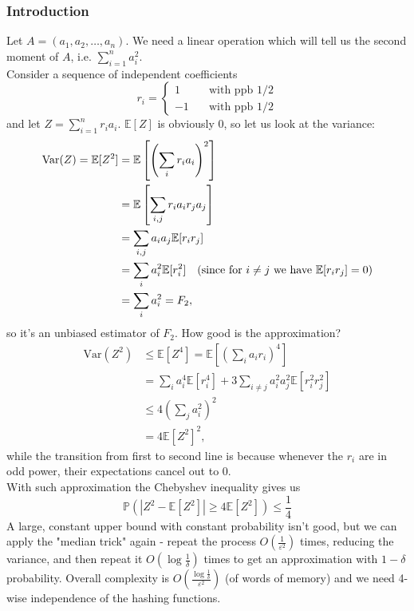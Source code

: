 \documentclass[11pt]{article}
\newcommand{\var}{\mathrm{Var}}
\begin{document}
\subsubsection{Introduction}
Let $A = (a_1, a_2, \dots, a_n)$. We need a linear operation which will tell us the second moment of $A$, i.e. $\sum_{i=1}^n a_i^2$. \\
Consider a sequence of independent coefficients $$r_i = \begin{cases}1 \quad&\textrm{with ppb }1/2\\ -1\quad&\textrm{with ppb }1/2 \end{cases}$$ 
and let $Z = \sum_{i=1}^n r_i a_i$. $\mathbb{E}[Z]$ is obviously 0, so let us look at the variance:
\begin{align*}
    \var(Z) = \mathbb{E}[Z^2] &= \mathbb{E}\left[ \left( \sum_i r_i a_i \right)^2 \right] \\
    &= \mathbb{E}\left[\sum_{i, j} r_i a_i r_j a_j \right] \\
    &= \sum_{i, j}a_i a_j \mathbb{E}[r_i r_j] \\
    &= \sum_i a_i^2 \mathbb{E}[r_i^2] \text{\quad (since for $i \neq j$ we have $\mathbb{E}[r_i r_j] = 0$)} \\
    &= \sum_i a_i^2 = F_2,
\end{align*}
so it's an unbiased estimator of $F_2$. How good is the approximation?
\begin{align*}
    \var(Z^2) &\leq \mathbb{E}[Z^4] = \mathbb{E}\left[ \left( \sum_i a_i r_i \right)^4 \right] \\
    &= \sum_i a_i^4 \mathbb{E}[r_i^4] + 3 \sum_{i \neq j} a_i^2 a_j^2 \mathbb{E}[r_i^2 r_j^2] \\
    &\leq 4 \left( \sum_j a_i^2 \right)^2 \\
    &= 4 \mathbb{E}[Z^2]^2,
\end{align*}
while the transition from first to second line is because whenever the $r_i$ are in odd power, their expectations cancel out to 0. \\
With such approximation the Chebyshev inequality gives us
$$ \mathbb{P} \left( \left|Z^2 - \mathbb{E}[Z^2] \right| \geq 4\mathbb{E}[Z^2] \right) \leq \frac{1}{4}$$
A large, constant upper bound with constant probability isn't good, but we can apply the "median trick" again - repeat the process $O\left( \frac{1}{\varepsilon^2} \right)$ times, reducing the variance, and then repeat it $O\left( \log \frac{1}{\delta} \right)$ times to get an approximation with $1 - \delta$ probability. Overall complexity is $O \left( \frac{\log \frac{1}{\delta}}{\varepsilon^2}\right)$ (of words of memory) and we need 4-wise independence of the hashing functions.
\end{document}
